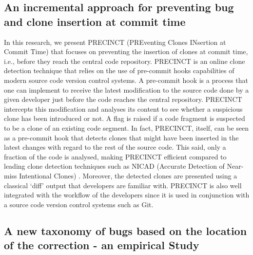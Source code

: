 \subsection{An incremental approach for preventing bug and clone insertion at commit time}
In this research, we present PRECINCT (PREventing Clones INsertion at Commit Time) that focuses on preventing the
insertion of clones at commit time, i.e., before they reach the central code repository.
PRECINCT is an online clone
detection technique that relies on the use of pre-commit hooks capabilities of modern source code version control systems.
A pre-commit hook is a process that one can implement to receive the latest modification to the source code done by a given developer just before the code reaches the central repository.
PRECINCT intercepts this modification and analyses its content to see whether a suspicious clone has been introduced
or not.
A flag is raised if a code fragment is suspected to be a clone of an existing code segment.
In fact, PRECINCT, itself, can be seen as a pre-commit hook that detects clones that might have been inserted in the latest changes with regard to the rest of the source code.
This said, only a fraction of the
code is analysed, making PRECINCT efficient compared to leading clone detection techniques such as NICAD (Accurate Detection of Near-miss Intentional Clones) \cite{Roy2008,Cordy2011}.
Moreover, the detected clones are presented using a classical ‘diff’ output that developers are familiar with.
PRECINCT is also well
integrated with the workflow of the developers since it is used in conjunction with a source code version control systems such as Git.

\subsection{A new taxonomy of bugs based on the location of the correction - an empirical Study}


